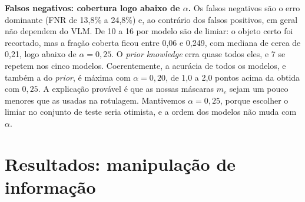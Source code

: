\documentclass[conference]{IEEEtran}
\begin{document}
\textbf{Falsos negativos: cobertura logo abaixo de $\alpha$.} Os falsos negativos são o erro dominante
(FNR de 13,8\% a 24,8\%) e, ao contrário dos falsos positivos, em geral não dependem do VLM. De 10 a 16
por modelo são de limiar: o objeto certo foi recortado, mas a fração coberta ficou entre 0,06 e 0,249,
com mediana de cerca de 0,21, logo abaixo de $\alpha=0{,}25$. O \emph{prior knowledge} erra quase todos
eles, e 7 se repetem nos cinco modelos. Coerentemente, a acurácia de todos os modelos, e também a do
\emph{prior}, é máxima com $\alpha=0{,}20$, de 1,0 a 2,0 pontos acima da obtida com $0{,}25$. A
explicação provável é que as nossas máscaras $m_c$ sejam um pouco menores que as usadas na rotulagem.
Mantivemos $\alpha=0{,}25$, porque escolher o limiar no conjunto de teste seria otimista, e a ordem dos
modelos não muda com $\alpha$.

\section{Resultados: manipulação de informação}
\label{sec:res-man}
\end{document}
